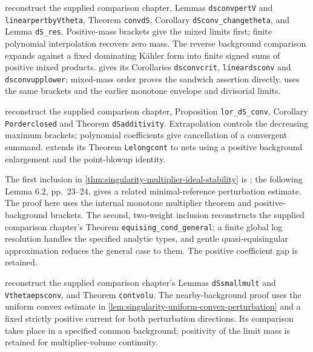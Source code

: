  reconstruct the supplied comparison chapter, Lemmas \texttt{dsconvpertV} and \texttt{linearpertbyVtheta}, Theorem \texttt{convdS}, Corollary \texttt{dSconv\_changetheta}, and Lemma \texttt{dS\_res}. Positive-mass brackets give the mixed limits first; finite polynomial interpolation recovers zero mass. The reverse background comparison expands against a fixed dominating K\"ahler form into finite signed sums of positive mixed products.  gives its Corollaries \texttt{dsconvcrit}, \texttt{lineardsconv} and \texttt{dsconvupplower}; mixed-mass order proves the sandwich assertion directly.  uses the same brackets and the earlier monotone envelope and divisorial limits.

 reconstruct the supplied comparison chapter, Proposition \texttt{lor\_dS\_conv}, Corollary \texttt{Porderclosed} and Theorem \texttt{dSadditivity}. Extrapolation controls the decreasing maximum brackets; polynomial coefficients give cancellation of a convergent summand.  extends its Theorem \texttt{Lelongcont} to nets using a positive background enlargement and the point-blowup identity.

The first inclusion in \cref{thm:singularity-multiplier-ideal-stability} is \cite[Theorem 6.1, p.~23]{DDNL2019metricv1}; the following Lemma 6.2, pp.~23--24, gives a related minimal-reference perturbation estimate. The proof here uses the internal monotone multiplier theorem and positive-background brackets. The second, two-weight inclusion reconstructs the supplied comparison chapter's Theorem \texttt{equising\_cond\_general}; a finite global log resolution handles the specified analytic types, and gentle quasi-equisingular approximation reduces the general case to them. The positive coefficient gap is retained.

 reconstruct the supplied comparison chapter's Lemmas \texttt{dSsmallmult} and \texttt{Vthetaepsconv}, and Theorem \texttt{contvolu}. The nearby-background proof uses the uniform convex estimate in \cref{lem:singularity-uniform-convex-perturbation} and a fixed strictly positive current for both perturbation directions. Its comparison takes place in a specified common background; positivity of the limit mass is retained for multiplier-volume continuity.

